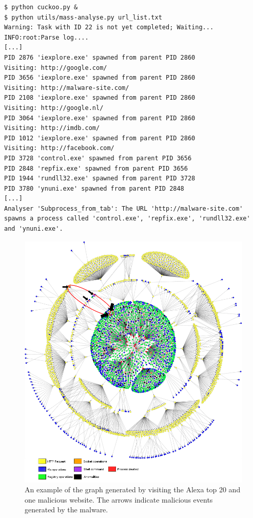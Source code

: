 \begin{lstlisting}[caption={Mass analyser being run},label={code:run}]
$ python cuckoo.py &
$ python utils/mass-analyse.py url_list.txt
Warning: Task with ID 22 is not yet completed; Waiting...
INFO:root:Parse log....
[...]
PID 2876 'iexplore.exe' spawned from parent PID 2860
Visiting: http://google.com/
PID 3656 'iexplore.exe' spawned from parent PID 2860
Visiting: http://malware-site.com/
PID 2108 'iexplore.exe' spawned from parent PID 2860
Visiting: http://google.nl/
PID 3064 'iexplore.exe' spawned from parent PID 2860
Visiting: http://imdb.com/
PID 1012 'iexplore.exe' spawned from parent PID 2860
Visiting: http://facebook.com/
PID 3728 'control.exe' spawned from parent PID 3656
PID 2848 'repfix.exe' spawned from parent PID 3656
PID 1944 'rundll32.exe' spawned from parent PID 3728
PID 3780 'ynuni.exe' spawned from parent PID 2848
[...]
Analyser 'Subprocess_from_tab': The URL 'http://malware-site.com' spawns a process called 'control.exe', 'repfix.exe', 'rundll32.exe' and 'ynuni.exe'.
\end{lstlisting}

\pagebreak

\begin{figure}[h]
    \centering
    \centerline{\includegraphics[width=20cm]{Images/graph4.jpg}}
    \caption{An example of the graph generated by visiting the Alexa top 20 and one malicious website. The arrows indicate malicious events generated by the malware.}
    \label{fig:graph}
\end{figure}

